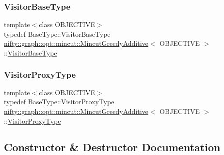 \subsubsection{\texorpdfstring{Visitor\+Base\+Type}{VisitorBaseType}}
{\footnotesize\ttfamily template$<$class O\+B\+J\+E\+C\+T\+I\+VE$>$ \\
typedef Base\+Type\+::\+Visitor\+Base\+Type \hyperlink{classnifty_1_1graph_1_1opt_1_1mincut_1_1MincutGreedyAdditive}{nifty\+::graph\+::opt\+::mincut\+::\+Mincut\+Greedy\+Additive}$<$ O\+B\+J\+E\+C\+T\+I\+VE $>$\+::\hyperlink{classnifty_1_1graph_1_1opt_1_1mincut_1_1MincutGreedyAdditive_a6754295908ae1d3f3ce8a98999bff99d}{Visitor\+Base\+Type}}

\mbox{\label{classnifty_1_1graph_1_1opt_1_1mincut_1_1MincutGreedyAdditive_a3891af76873b45807f761c64701aeab9}} 
\subsubsection{\texorpdfstring{Visitor\+Proxy\+Type}{VisitorProxyType}}
{\footnotesize\ttfamily template$<$class O\+B\+J\+E\+C\+T\+I\+VE$>$ \\
typedef \hyperlink{classnifty_1_1graph_1_1opt_1_1common_1_1SolverBase_ad209b469b3bc9fc0fc14e9fed4d09075}{Base\+Type\+::\+Visitor\+Proxy\+Type} \hyperlink{classnifty_1_1graph_1_1opt_1_1mincut_1_1MincutGreedyAdditive}{nifty\+::graph\+::opt\+::mincut\+::\+Mincut\+Greedy\+Additive}$<$ O\+B\+J\+E\+C\+T\+I\+VE $>$\+::\hyperlink{classnifty_1_1graph_1_1opt_1_1mincut_1_1MincutGreedyAdditive_a3891af76873b45807f761c64701aeab9}{Visitor\+Proxy\+Type}}



\subsection{Constructor \& Destructor Documentation}
\mbox{\label{classnifty_1_1graph_1_1opt_1_1mincut_1_1MincutGreedyAdditive_aa1f9747e0319c0614c9d0e04586d8e46}} 
